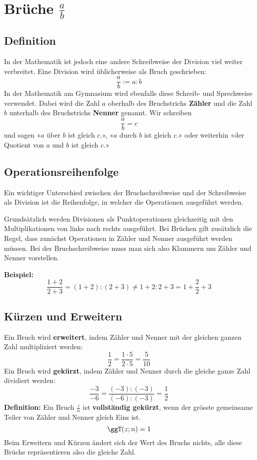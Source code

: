 \newpage
\section{Brüche $\frac{a}{b}$}

\subsection{Definition}

In der Mathematik ist jedoch eine andere Schreibweise der Division viel weiter verbreitet. Eine Division wird üblicherweise als Bruch geschrieben:
\[
  \frac{a}{b} := a:b
\]
In der Mathematik am Gymnasium wird ebenfalls diese Schreib- und Sprechweise verwendet. Dabei wird die Zahl $a$ oberhalb des Bruchstrichs \textbf{Zähler} und die Zahl $b$ unterhalb des Bruchstrichs \textbf{Nenner} genannt. Wir schreiben
\[
  \frac{a}{b} = c
\]
und sagen «$a$ über $b$ ist gleich $c$.», «$a$ durch $b$ ist gleich $c$.» oder weiterhin «der Quotient von $a$ und $b$ ist gleich $c$.»

\subsection{Operationsreihenfolge}

Ein wichtiger Unterschied zwischen der Bruchschreibweise und der Schreibweise als Division ist die Reihenfolge, in welcher die Operationen ausgeführt werden.

Grundsätzlich werden Divisionen als Punktoperationen gleichzeitig mit den Multiplikationen von links nach rechts ausgeführt. Bei Brüchen gilt zusätzlich die Regel, dass zunächst Operationen in Zähler und Nenner ausgeführt werden müssen. Bei der Bruchschreibweise muss man sich also Klammern um Zähler und Nenner vorstellen.
\begin{example}
  \textbf{Beispiel:}
  \[
    \frac{1+2}{2+3} = (1+2):(2+3) \ne 1+2:2+3 = 1+\frac{2}{2}+3
  \]
\end{example}

\subsection{Kürzen und Erweitern}

Ein Bruch wird \textbf{erweitert}, indem Zähler und Nenner mit der gleichen ganzen Zahl multipliziert werden:
\[
  \frac{1}{2} = \frac{1\cdot 5}{2\cdot 5} = \frac{5}{10}
\]
Ein Bruch wird \textbf{gekürzt}, indem Zähler und Nenner durch die gleiche ganze Zahl dividiert werden:
\[
  \frac{-3}{-6} = \frac{(-3):(-3)}{(-6):(-3)} = \frac{1}{2}
\]
\textbf{Definition:} Ein Bruch $\frac{z}{n}$ ist \textbf{vollständig gekürzt}, wenn der grösste gemeinsame Teiler von Zähler und Nenner gleich Eins ist.
\[
  \ggT(z;n) = 1
\]
Beim Erweitern und Kürzen ändert sich der Wert des Bruchs nichts, alle diese Brüche repräsentieren also die gleiche Zahl.

